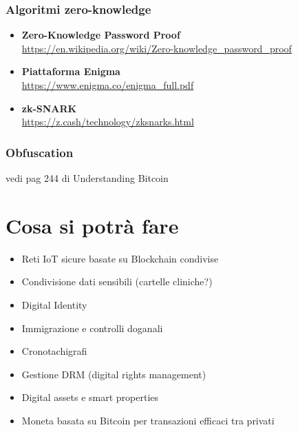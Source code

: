         \subsubsection{Algoritmi zero-knowledge}
            \begin{itemize}
                \item \textbf{Zero-Knowledge Password Proof} \\
                    \url{https://en.wikipedia.org/wiki/Zero-knowledge_password_proof}
                \item \textbf{Piattaforma Enigma} \\
                        \url{https://www.enigma.co/enigma_full.pdf}
                \item \textbf{zk-SNARK} \\
                    \url{https://z.cash/technology/zksnarks.html}
            \end{itemize}
        \subsubsection{Obfuscation}
            vedi pag 244 di Understanding Bitcoin

\section{Cosa si potrà fare}
    \begin{itemize}
        \item Reti IoT sicure basate su Blockchain condivise
        \item Condivisione dati sensibili (cartelle cliniche?)
        \item Digital Identity
        \item Immigrazione e controlli doganali
        \item Cronotachigrafi
        \item Gestione DRM (digital rights management)
        \item Digital assets e smart properties
        \item Moneta basata su Bitcoin per transazioni efficaci tra privati
\end{itemize}
